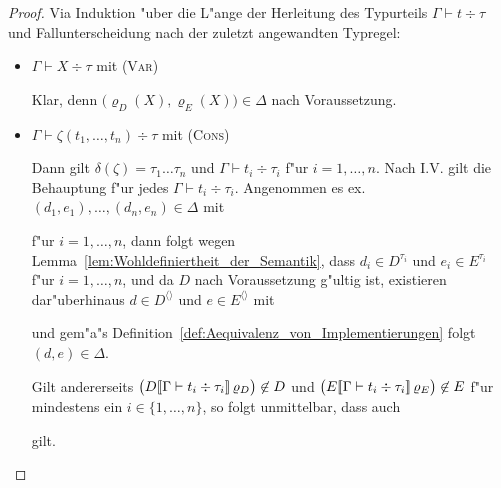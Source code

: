 \documentclass[%
  12pt,%
  a4paper,%
]{article}
\newcommand{\Tj}[3]{{#1}\vdash{#2}\div{#3}}
\begin{document}
\begin{proof}
  Via Induktion "uber die L"ange der Herleitung des Typurteils $\Tj{\Gamma}{t}{\tau}$ und Fallunterscheidung
  nach der zuletzt angewandten Typregel:
  \begin{itemize}
  \item $\Tj{\Gamma}{X}{\tau}$ mit \textsc{(Var)}

    Klar, denn $\bigl(\varrho_D(X), \varrho_E(X)\bigr) \in \Delta$ nach Voraussetzung.

  \item $\Tj{\Gamma}{\zeta(t_1,\ldots,t_n)}{\tau}$ mit \textsc{(Cons)}

    Dann gilt $\delta(\zeta) = \tau_1 \ldots \tau_n$ und $\Tj{\Gamma}{t_i}{\tau_i}$ 
    f"ur $i=1,\ldots,n$. Nach I.V. gilt die Behauptung f"ur jedes $\Tj{\Gamma}{t_i}{\tau_i}$.
    Angenommen es ex. $(d_1,e_1),\ldots,(d_n,e_n) \in \Delta$ mit
    f"ur $i=1,\ldots,n$, dann folgt wegen Lemma~\ref{lem:Wohldefiniertheit_der_Semantik}, dass
    $d_i \in D^{\tau_i}$ und $e_i \in E^{\tau_i}$
    f"ur $i=1,\ldots,n$, und da $D$ nach Voraussetzung g"ultig ist, existieren dar"uberhinaus
    $d \in D^{\langle \rangle}$ und $e \in E^{\langle \rangle}$ mit
    und gem"a"s Definition~\ref{def:Aequivalenz_von_Implementierungen} folgt $(d,e) \in \Delta$.

    Gilt andererseits
    $\bigl(D\sem{\Tj{\Gamma}{t_i}{\tau_i}}\,\varrho_D\bigr) \not\in D$
    und
    $\bigl(E\sem{\Tj{\Gamma}{t_i}{\tau_i}}\,\varrho_E\bigr) \not\in E$
    f"ur mindestens ein $i \in \{1,\ldots,n\}$, so folgt unmittelbar, dass auch
    gilt.


\end{itemize}
\end{proof}
\end{document}
